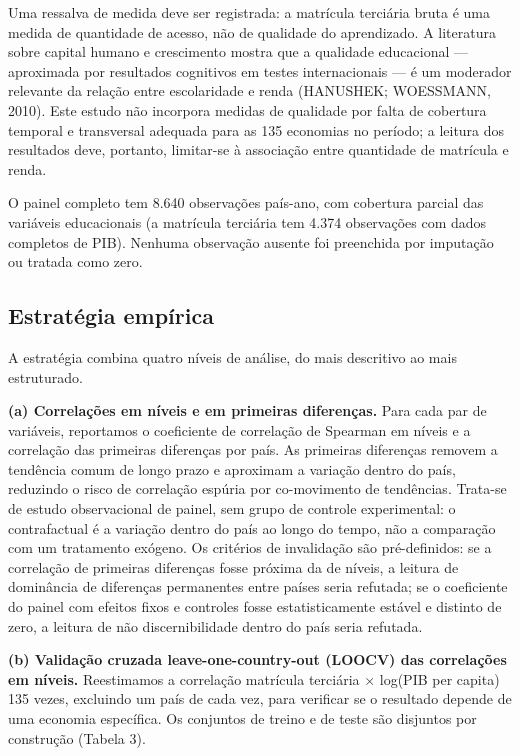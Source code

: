\documentclass[12pt,a4paper]{article}
\begin{document}
Uma ressalva de medida deve ser registrada: a matrícula terciária bruta é uma medida de quantidade de acesso, não de qualidade do aprendizado. A literatura sobre capital humano e crescimento mostra que a qualidade educacional --- aproximada por resultados cognitivos em testes internacionais --- é um moderador relevante da relação entre escolaridade e renda (HANUSHEK; WOESSMANN, 2010). Este estudo não incorpora medidas de qualidade por falta de cobertura temporal e transversal adequada para as 135 economias no período; a leitura dos resultados deve, portanto, limitar-se à associação entre quantidade de matrícula e renda.

O painel completo tem 8.640 observações país-ano, com cobertura parcial das variáveis educacionais (a matrícula terciária tem 4.374 observações com dados completos de PIB). Nenhuma observação ausente foi preenchida por imputação ou tratada como zero.

\subsection{Estratégia empírica}

A estratégia combina quatro níveis de análise, do mais descritivo ao mais estruturado.

\textbf{(a) Correlações em níveis e em primeiras diferenças.} Para cada par de variáveis, reportamos o coeficiente de correlação de Spearman em níveis e a correlação das primeiras diferenças por país. As primeiras diferenças removem a tendência comum de longo prazo e aproximam a variação dentro do país, reduzindo o risco de correlação espúria por co-movimento de tendências. Trata-se de estudo observacional de painel, sem grupo de controle experimental: o contrafactual é a variação dentro do país ao longo do tempo, não a comparação com um tratamento exógeno. Os critérios de invalidação são pré-definidos: se a correlação de primeiras diferenças fosse próxima da de níveis, a leitura de dominância de diferenças permanentes entre países seria refutada; se o coeficiente do painel com efeitos fixos e controles fosse estatisticamente estável e distinto de zero, a leitura de não discernibilidade dentro do país seria refutada.

\textbf{(b) Validação cruzada leave-one-country-out (LOOCV) das correlações em níveis.} Reestimamos a correlação matrícula terciária $\times$ log(PIB per capita) 135 vezes, excluindo um país de cada vez, para verificar se o resultado depende de uma economia específica. Os conjuntos de treino e de teste são disjuntos por construção (Tabela 3).
\end{document}
